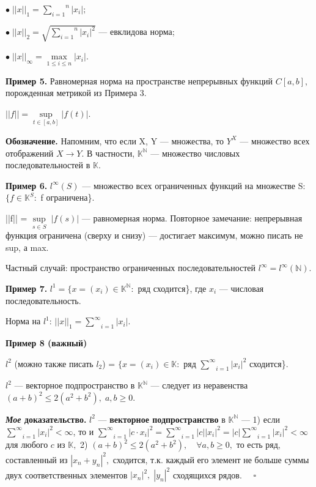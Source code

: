 \documentclass[12pt,a4paper]{article}
\begin{document}
$\bullet \; ||x||_{1} = \overset{n}{\underset{i = 1}{\sum}} |x_i|;$

$\bullet \; ||x||_{2} = \sqrt{\overset{n}{\underset{i = 1}{\sum}} |x_{i}|^2}$ --- евклидова норма; 

$\bullet \; ||x||_{\infty} = \underset{1 \leq i \leq n}{\max}|x_{i}|$. 

\textbf{Пример 5.} Равномерная норма на пространстве непрерывных функций $C[a, b],$ порожденная метрикой из Примера 3.

$||f|| = \underset{t \in [a, b]}{\sup}|f(t)|.$

\textbf{Обозначение.} Напомним, что если X, Y --- множества, то $Y^{X}$ --- множество всех отображений $X \to Y$. В частности, $\mathbb{K^N}$ --- множество числовых последовательностей в $\mathbb{K}$. 

\textbf{Пример 6.} $l^{\infty}(S)$ --- множество всех ограниченных функций на множестве S: $\{f \in \mathbb{K}^S:$ f ограничена\}. 

||f|| = $\underset{s \in S}{\sup} \; |f(s)|$ --- равномерная норма. Повторное замечание: непрерывная функция ограничена (сверху и снизу) --- достигает максимум, можно писать не sup, а max. 

Частный случай: пространство ограниченных последовательностей $l^{\infty} = l^{\infty}(\mathbb{N}).$ 

\textbf{Пример 7.} $l^{1} = \{x = (x_{i}) \in \mathbb{K^N}\!\!:$ ряд сходится\}, где $x_{i}$ --- числовая последовательность. 

Норма на $l^{1}$: $||x||_{1} = \underset{i = 1}{\overset{\infty}{\sum}}|x_{i}|.$ 

\textbf{Пример 8 (важный)}

$l^{2}$ (можно также писать $l_{2}$) = $\{x = (x_{i}) \in \mathbb{K}:$ ряд $\underset{i = 1}{\overset{\infty}{\sum}}|x_{i}|^2$ сходится\}. 

$l^{2}$ --- векторное подпространство в $\mathbb{K^N}$ --- следует из неравенства $(a + b)^2 \leq 2(a^2 + b^2), \; a, b \geq 0.$

\textbf{\textit{Мое} доказательство.} $l^{2}$ --- \textbf{векторное подпространство} в $\mathbb{K^N}$ --- 1) если $\underset{i = 1}{\overset{\infty}{\sum}}|x_{i}|^2 < \infty$, то и $\underset{i = 1}{\overset{\infty}{\sum}}|c \cdot x_{i}|^2 = \underset{i = 1}{\overset{\infty}{\sum}}|c||x_{i}|^2 = |c|\underset{i = 1}{\overset{\infty}{\sum}}|x_{i}|^2 < \infty$ для любого $c$ из $\mathbb{K},$ 2) $(a + b)^2 \leq 2(a^2 + b^2), \quad \forall a, b \geq 0,$ то есть ряд, составленный из $|x_{n} + y_{n}|^{2},$ сходится, т.к. каждый его элемент не больше суммы двух соответственных элементов $|x_{n}|^{2}, \; |y_{n}|^{2}$ сходящихся рядов. $\quad \square$ 
\end{document}
